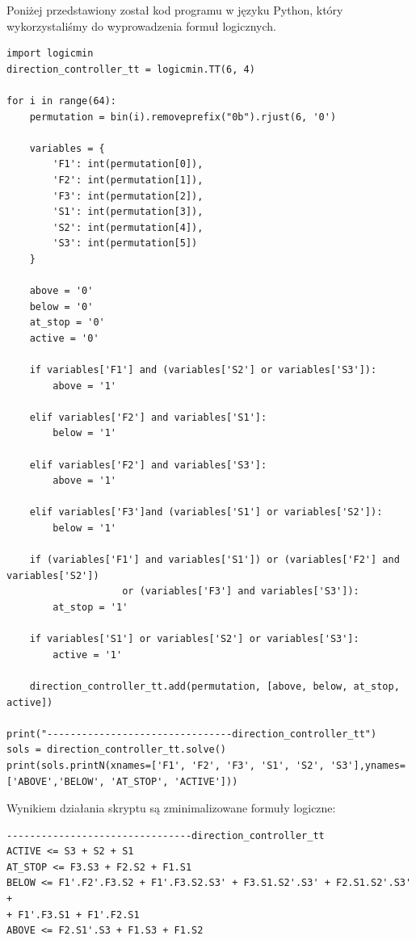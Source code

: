\documentclass[a4paper]{article}
\begin{document}
Poniżej przedstawiony został kod programu w języku Python, który wykorzystaliśmy do wyprowadzenia
formuł logicznych.
\begin{verbatim}
import logicmin
direction_controller_tt = logicmin.TT(6, 4)

for i in range(64):
    permutation = bin(i).removeprefix("0b").rjust(6, '0')
    
    variables = {
        'F1': int(permutation[0]),
        'F2': int(permutation[1]),
        'F3': int(permutation[2]),
        'S1': int(permutation[3]),
        'S2': int(permutation[4]),
        'S3': int(permutation[5])
    }

    above = '0'
    below = '0'
    at_stop = '0'
    active = '0'

    if variables['F1'] and (variables['S2'] or variables['S3']):
        above = '1'
    
    elif variables['F2'] and variables['S1']:
        below = '1'

    elif variables['F2'] and variables['S3']:
        above = '1'
    
    elif variables['F3']and (variables['S1'] or variables['S2']):
        below = '1'

    if (variables['F1'] and variables['S1']) or (variables['F2'] and variables['S2']) 
                    or (variables['F3'] and variables['S3']):
        at_stop = '1'

    if variables['S1'] or variables['S2'] or variables['S3']:
        active = '1'

    direction_controller_tt.add(permutation, [above, below, at_stop, active])

print("--------------------------------direction_controller_tt")
sols = direction_controller_tt.solve()
print(sols.printN(xnames=['F1', 'F2', 'F3', 'S1', 'S2', 'S3'],ynames=['ABOVE','BELOW', 'AT_STOP', 'ACTIVE']))
\end{verbatim}
Wynikiem działania skryptu są zminimalizowane formuły logiczne:

\begin{verbatim}
--------------------------------direction_controller_tt
ACTIVE <= S3 + S2 + S1
AT_STOP <= F3.S3 + F2.S2 + F1.S1
BELOW <= F1'.F2'.F3.S2 + F1'.F3.S2.S3' + F3.S1.S2'.S3' + F2.S1.S2'.S3' + 
+ F1'.F3.S1 + F1'.F2.S1
ABOVE <= F2.S1'.S3 + F1.S3 + F1.S2
\end{verbatim}
\end{document}
